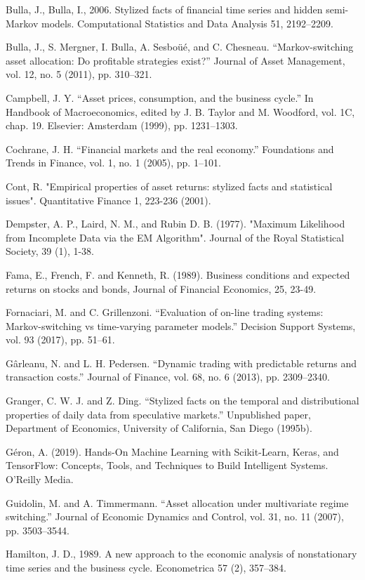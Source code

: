 Bulla, J., Bulla, I., 2006. Stylized facts of financial time series and hidden semi- Markov models. Computational Statistics and Data Analysis 51, 2192–2209.

Bulla, J., S. Mergner, I. Bulla, A. Sesboüé, and C. Chesneau. “Markov-switching asset allocation: Do profitable strategies exist?” Journal of Asset Management, vol. 12, no. 5 (2011), pp. 310–321.

Campbell, J. Y. “Asset prices, consumption, and the business cycle.” In Handbook of Macroeconomics, edited by J. B. Taylor and M. Woodford, vol. 1C, chap. 19. Elsevier: Amsterdam (1999), pp. 1231–1303.

Cochrane, J. H. “Financial markets and the real economy.” Foundations and Trends in Finance, vol. 1, no. 1 (2005), pp. 1–101.

Cont, R. "Empirical properties of asset returns: stylized facts and statistical issues". Quantitative Finance 1, 223-236 (2001).

Dempster, A. P., Laird, N. M., and Rubin D. B. (1977). "Maximum Likelihood from Incomplete Data via the EM Algorithm". Journal of the Royal Statistical Society, 39 (1), 1-38.

Fama, E., French, F. and Kenneth, R. (1989). Business conditions and expected returns on stocks and bonds, Journal of Financial Economics, 25, 23-49.

Fornaciari, M. and C. Grillenzoni. “Evaluation of on-line trading systems: Markov-switching vs time-varying parameter models.” Decision Support Systems, vol. 93 (2017), pp. 51–61.

Gârleanu, N. and L. H. Pedersen. “Dynamic trading with predictable returns and
transaction costs.” Journal of Finance, vol. 68, no. 6 (2013), pp. 2309–2340.

Granger, C. W. J. and Z. Ding. “Stylized facts on the temporal and distributional properties of daily data from speculative markets.” Unpublished paper, Department of Economics, University of California, San Diego (1995b).

Géron, A. (2019). Hands-On Machine Learning with Scikit-Learn, Keras, and TensorFlow: Concepts, Tools, and Techniques to Build Intelligent Systems. O’Reilly Media.

Guidolin, M. and A. Timmermann. “Asset allocation under multivariate regime switching.” Journal of Economic Dynamics and Control, vol. 31, no. 11 (2007), pp. 3503–3544.

Hamilton, J. D., 1989. A new approach to the economic analysis of nonstationary time series and the business cycle. Econometrica 57 (2), 357–384.

